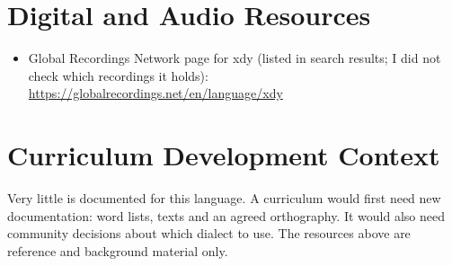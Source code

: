 \documentclass[12pt]{article}
\begin{document}
\section{Digital and Audio Resources}
\begin{itemize}
\item Global Recordings Network page for xdy (listed in search results; I did not check which recordings it holds): \url{https://globalrecordings.net/en/language/xdy}
\end{itemize}

\section{Curriculum Development Context}
Very little is documented for this language. A curriculum would first need new documentation: word lists, texts and an agreed orthography. It would also need community decisions about which dialect to use. The resources above are reference and background material only.
\end{document}
